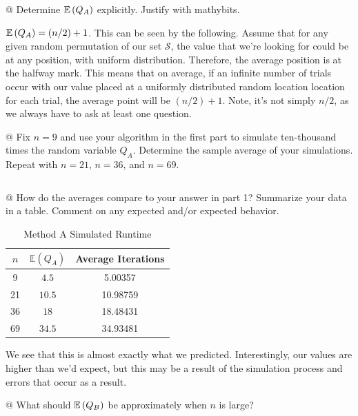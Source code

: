\documentclass[11pt]{article}
\begin{document}
\begin{easylist}[enumerate]
    @ Determine $\mathbb{E}\left( Q_A \right)$ explicitly. Justify with mathybits.

    \vspace{0.25cm}
    $\mathbb{E}\left( Q_A \right) = (n / 2) + 1$. This can be seen by the following.
    Assume that for any given random permutation of our set $\mathcal{S}$, the
    value that we're looking for could be at any position, with uniform
    distribution.  Therefore, the average position is at the halfway mark. This
    means that on average, if an infinite number of trials occur with our value
    placed at a uniformly distributed random location location for each trial,
    the average point will be $(n / 2) + 1$. Note, it's not simply $n / 2$, as
    we always have to ask at least one question.

    @ Fix $n = 9$ and use your algorithm in the first part to simulate
    ten-thousand times the random variable $Q_A$. Determine the sample average
    of your simulations. Repeat with $n=21$, $n=36$, and $n=69$.

    \weave
    \inputminted[firstline=20,lastline=24]{python}{lab1_part2.py}
    \noweave

    @ How do the averages compare to your answer in part 1? Summarize your data in
    a table.  Comment on any expected and/or expected behavior.

    \begin{table}[H]
        \centering
        \begin{tabular}{|c|c|c|}
            \hline
            $n$ & $\mathbb{E}(Q_A)$ & Average Iterations\\
            \hline
            9  & $4.5$  & 5.00357\\
            21 & $10.5$ & 10.98759\\
            36 & $18$   & 18.48431\\
            69 & $34.5$ & 34.93481\\
            \hline
        \end{tabular}
        \caption{Method A Simulated Runtime}
        \label{table:methoda}
    \end{table}

    We see that this is almost exactly what we predicted. Interestingly, our
    values are higher than we'd expect, but this may be a result of the
    simulation process and errors that occur as a result.

    @ What should $\mathbb{E}\left( Q_B \right)$ be approximately when $n$ is large?


\end{easylist}
\end{document}
